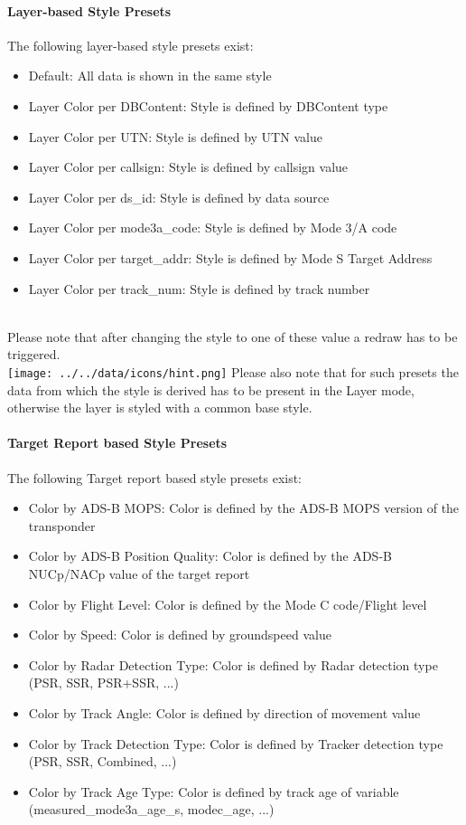\paragraph{Layer-based Style Presets}
The following layer-based style presets exist:
\begin{itemize}
 \item Default: All data is shown in the same style
 \item Layer Color per DBContent: Style is defined by DBContent type
 \item Layer Color per UTN: Style is defined by UTN value
 \item Layer Color per callsign: Style is defined by callsign value
 \item Layer Color per ds\_id: Style is defined by data source
 \item Layer Color per mode3a\_code: Style is defined by Mode 3/A code
 \item Layer Color per target\_addr: Style is defined by Mode S Target Address
 \item Layer Color per track\_num: Style is defined by track number
\end{itemize}
\  \\

Please note that after changing the style to one of these value a redraw has to be triggered. \\

\texttt{[image: ../../data/icons/hint.png]} Please also note that for such presets the data from which the style is derived has to be present in the Layer mode, otherwise the layer is styled with a common base style.

\paragraph{Target Report based Style Presets}
The following Target report based style presets exist:
\begin{itemize}
 \item Color by ADS-B MOPS: Color is defined by the ADS-B MOPS version of the transponder
 \item Color by ADS-B Position Quality: Color is defined by the ADS-B NUCp/NACp value of the target report
 \item Color by Flight Level: Color is defined by the Mode C code/Flight level
 \item Color by Speed: Color is defined by groundspeed value
 \item Color by Radar Detection Type: Color is defined by Radar detection type (PSR, SSR, PSR+SSR, ...)
 \item Color by Track Angle: Color is defined by direction of movement value
 \item Color by Track Detection Type: Color is defined by Tracker detection type (PSR, SSR, Combined, ...)
 \item Color by Track Age Type: Color is defined by track age of variable (measured\_mode3a\_age\_s, modec\_age, ...)
\end{itemize}
\  \\

